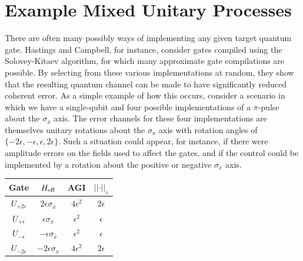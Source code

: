 \documentclass[aps,nofootinbib,pra,notitlepage,twocolumn]{revtex4-1}
\begin{document}

\section{Example Mixed Unitary Processes}
\label{sec:mixed_unitary_processes}
There are often many possibly ways of implementing any given target quantum gate. Hastings and Campbell, for instance, consider gates compiled using the Solovey-Kitaev algorithm, for which  many approximate gate compilations are possible. By selecting from these various implementations at random, they show that the resulting quantum channel can be made to have significantly reduced coherent error. As a simple example of how this occurs, consider a scenario in which we have a single-qubit and four possible implementations of a $\pi$-pulse about the $\sigma_x$ axis. The error channels for these four implementations are themselves unitary rotations about the $\sigma_x$ axis with rotation angles of $\{-2\epsilon, -\epsilon, \epsilon, 2\epsilon\}$. Such a situation could appear, for instance, if there were amplitude errors on the fields used to affect the gates, and if the control could be implemented by a rotation about the positive or negative $\sigma_x$ axis.

\begin{center}

\begin{tabular}{cccc}
	Gate & $H_{\rm{eff}}$ & AGI & $\vert\vert\cdot\vert\vert_\diamond$ \\
\hline
	$U_{+2\epsilon}$ & $2\epsilon \sigma_x$ & $4\epsilon^2$ & $2\epsilon$\\
	$U_{+\epsilon}$ & $\epsilon \sigma_x$ & $\epsilon^2$ & $\epsilon$ \\
	$U_{-\epsilon}$ & $-\epsilon \sigma_x$ & $\epsilon^2$ & $\epsilon$ \\
	$U_{-2\epsilon}$ & $-2\epsilon \sigma_x$ & $4\epsilon^2$ & $2\epsilon$ 
\end{tabular}

\end{center}
\end{document}
